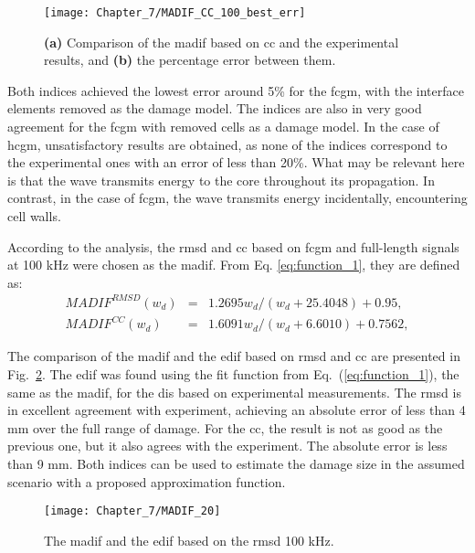 \begin{figure}
	\begin{center}
		\texttt{[image: Chapter\_7/MADIF\_CC\_100\_best\_err]}
	\end{center}
	\caption{\textbf{(a)} Comparison of the \acf{madif} based on \acf{cc} and the experimental results, and \textbf{(b)} the percentage error between them.}
	\label{fig:madif_cc_best}
\end{figure}
Both indices achieved the lowest error around 5\% for the \ac{fcgm}, with the interface elements removed as the damage model.
The indices are also in very good agreement for the \ac{fcgm} with removed cells as a damage model.
In the case of \ac{hcgm}, unsatisfactory results are obtained, as none of the indices correspond to the experimental ones with an error of less than 20\%.
What may be relevant here is that the wave transmits energy to the core throughout its propagation.
In contrast, in the case of \ac{fcgm}, the wave transmits energy incidentally, encountering cell walls.

According to the analysis, the \ac{rmsd} and \ac{cc} based on \ac{fcgm} and full-length signals at 100 \unit{kHz} were chosen as the \ac{madif}.
From Eq. \ref{eq:function_1}, they are defined as:
\begin{eqnarray}
	MADIF^{RMSD}(w_d) & = & {1.2695w_d}/(w_d+25.4048)+0.95,
	\label{eq:MADIF_RMSD}\\
	MADIF^{CC}(w_d) & = & 1.6091w_d/(w_d+6.6010)+0.7562,
	\label{eq:MADIF_CC}
\end{eqnarray}

The comparison of the \ac{madif} and the \ac{edif} based on \ac{rmsd} and \ac{cc} are presented in Fig.~\ref{fig:madif_20}.
The \ac{edif} was found using the fit function from Eq.~(\ref{eq:function_1}), the same as the \ac{madif}, for the \acp{di} based on experimental measurements.
The \ac{rmsd} is in excellent agreement with experiment, achieving an absolute error of less than 4 mm over the full range of damage.
For the \ac{cc}, the result is not as good as the previous one, but it also agrees with the experiment.
The absolute error is less than 9 mm.
Both indices can be used to estimate the damage size in the assumed scenario with a proposed approximation function.
\begin{figure}[!tbh]
	\begin{center}
		\texttt{[image: Chapter\_7/MADIF\_20]}
	\end{center}
	\caption{The \acf{madif} and the \acf{edif} based on the \acf{rmsd} 100 \unit{\kHz}.}
	\label{fig:madif_20}
\end{figure}
\clearpage